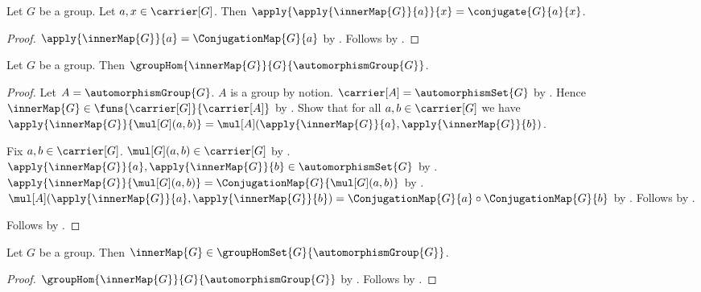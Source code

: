 \begin{proposition}\label{inner_map_apply_element}
    Let $G$ be a group.
    Let $a,x\in\carrier[G]$.
    Then $\apply{\apply{\innerMap{G}}{a}}{x}=\conjugate{G}{a}{x}$.
\end{proposition}
\begin{proof}
    $\apply{\innerMap{G}}{a}=\ConjugationMap{G}{a}$ by
        .
    Follows by .
\end{proof}

\begin{theorem}\label{inner_map_group_hom}
    Let $G$ be a group.
    Then
        $\groupHom{\innerMap{G}}{G}{\automorphismGroup{G}}$.
\end{theorem}
\begin{proof}
    Let $A=\automorphismGroup{G}$.
    $A$ is a group by notion.
    $\carrier[A]=\automorphismSet{G}$ by
        .
    Hence $\innerMap{G}\in\funs{\carrier[G]}{\carrier[A]}$ by
        .
    Show that for all $a,b\in\carrier[G]$ we have
        $\apply{\innerMap{G}}{\mul[G](a,b)}=
            \mul[A](\apply{\innerMap{G}}{a},\apply{\innerMap{G}}{b})$.
    \begin{subproof}
        Fix $a,b\in\carrier[G]$.
        $\mul[G](a,b)\in\carrier[G]$ by
            .
        $\apply{\innerMap{G}}{a},\apply{\innerMap{G}}{b}
            \in\automorphismSet{G}$ by
            .
        $\apply{\innerMap{G}}{\mul[G](a,b)}=
            \ConjugationMap{G}{\mul[G](a,b)}$ by
            .
        $\mul[A](\apply{\innerMap{G}}{a},\apply{\innerMap{G}}{b})=
            \ConjugationMap{G}{a}\circ\ConjugationMap{G}{b}$ by
            .
        Follows by .
    \end{subproof}
    Follows by .
\end{proof}

\begin{corollary}\label{inner_map_in_group_hom_set}
    Let $G$ be a group.
    Then $\innerMap{G}\in
        \groupHomSet{G}{\automorphismGroup{G}}$.
\end{corollary}
\begin{proof}
    $\groupHom{\innerMap{G}}{G}{\automorphismGroup{G}}$ by
        .
    Follows by .
\end{proof}

